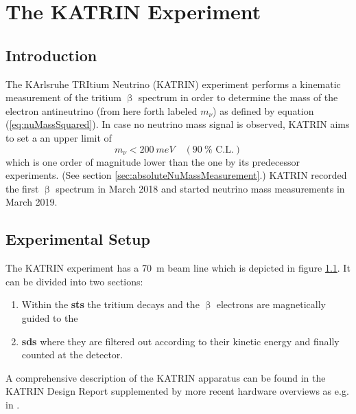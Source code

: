 
\chapter{The KATRIN Experiment}
\section{Introduction}
The KArlsruhe TRItium Neutrino (KATRIN) experiment performs a kinematic measurement of the tritium $\upbeta$ spectrum in order to determine the mass of the electron antineutrino (from here forth labeled $m_\nu$) as defined by equation (\ref{eq:nuMassSquared}). In case no neutrino mass signal is observed, KATRIN aims to set a an upper limit of
\begin{equation*}
    m_\nu < \SI{200}{meV} \quad (\SI{90}{\percent} \text{ C.L.})
\end{equation*}
which is one order of magnitude lower than the one by its predecessor experiments. (See section \ref{sec:absoluteNuMassMeasurement}.)
KATRIN recorded the first $\upbeta$ spectrum in March 2018 and started neutrino mass measurements in March 2019.

\section{Experimental Setup}
\begin{figure}[t]
 \label{fig:beamline}
\end{figure}
The KATRIN experiment has a \SI{70}{m} beam line which is depicted in figure \ref{fig:beamline}. It can be divided into two sections: 
\begin{enumerate}
    \item Within the \textbf{\gls{sts}} the tritium decays and the $\upbeta$ electrons are magnetically guided to the 
    \item \textbf{\gls{sds}} where they are filtered out according to their kinetic energy and finally counted at the detector.
\end{enumerate}
A comprehensive description of the KATRIN apparatus can be found in the KATRIN Design Report \cite{Angrik:2005ep} supplemented by more recent hardware overviews as e.g. in \cite{SeitzM2019}.

